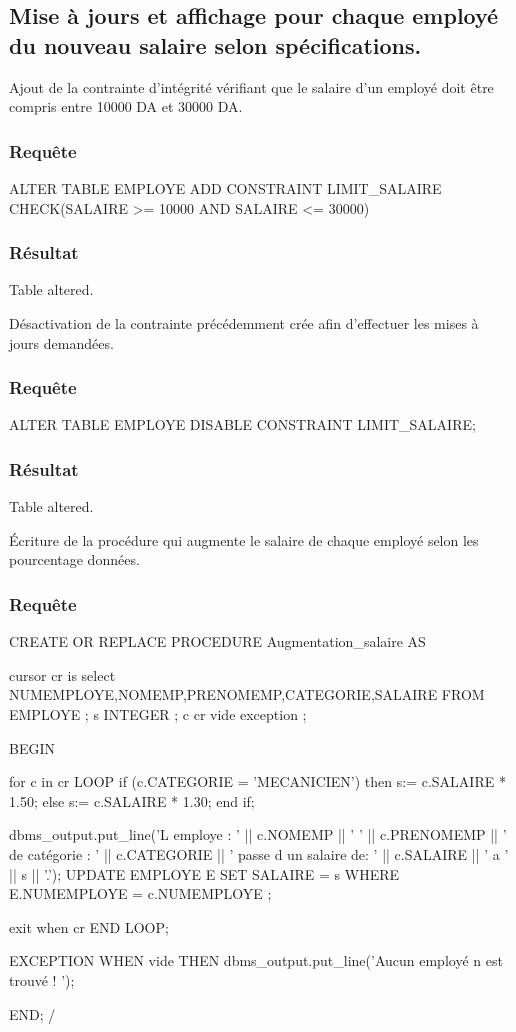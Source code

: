 \documentclass[•]{article}
\begin{document}
\subsection{Mise à jours et affichage pour chaque employé du nouveau salaire selon spécifications.}
Ajout de la contrainte d'intégrité vérifiant que le salaire d'un employé doit être compris entre 10000 DA et 30000 DA.
\subsubsection{Requête}
\begin{sql}
ALTER TABLE EMPLOYE ADD CONSTRAINT LIMIT_SALAIRE CHECK(SALAIRE >= 10000 AND SALAIRE <= 30000)
\end{sql}
\subsubsection{Résultat}
\begin{sql}
Table altered.
\end{sql}


Désactivation de la contrainte précédemment crée afin d'effectuer les mises à jours demandées.
\subsubsection{Requête}
\begin{sql}
ALTER TABLE EMPLOYE DISABLE CONSTRAINT LIMIT_SALAIRE;
\end{sql}
\subsubsection{Résultat}
\begin{sql}
Table altered.
\end{sql}


Écriture de la procédure qui augmente le salaire de chaque employé selon les pourcentage données.
\subsubsection{Requête}
\begin{sql}
CREATE OR REPLACE PROCEDURE Augmentation_salaire
AS

cursor cr is select NUMEMPLOYE,NOMEMP,PRENOMEMP,CATEGORIE,SALAIRE FROM EMPLOYE ;
s INTEGER ;
c cr%
vide exception ;

BEGIN

for c in cr LOOP
	if (c.CATEGORIE = 'MECANICIEN')
	then
		s:= c.SALAIRE * 1.50;
	else
		s:= c.SALAIRE * 1.30;
	end if;
	
	dbms_output.put_line('L employe : ' || c.NOMEMP || ' ' || c.PRENOMEMP || ' de catégorie : ' || c.CATEGORIE || ' passe d un salaire de: ' || c.SALAIRE || ' a ' || s || '.');
	UPDATE EMPLOYE E SET SALAIRE = s WHERE E.NUMEMPLOYE = c.NUMEMPLOYE ;
	
	exit when cr%
END LOOP;

EXCEPTION WHEN vide THEN
	dbms_output.put_line('Aucun employé n est trouvé ! ');

END;
/
\end{sql}
\end{document}
